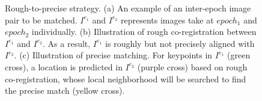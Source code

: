 \begin{figure}[htbp]
	\begin{center}
		\caption{ Rough-to-precise strategy. (a) An example of an inter-epoch image pair to be matched. $I^{e_1}$ and $I^{e_2}$ represents images take at $epoch_1$ and $epoch_2$ individually. (b) Illustration of rough co-registration between $I^{e_1}$ and $I^{e_2}$. As a result, $I^{e_1}$ is roughly but not precisely aligned with $I^{e_2}$. (c) Illustration of precise matching. For keypoints in $I^{e_1}$ (green cross), a location is predicted in $I^{e_2}$ (purple cross) based on rough co-registration, whose local neighborhood will be searched to find the precise match (yellow cross).}
		\label{rough-to-precise}
	\end{center}
\end{figure}


